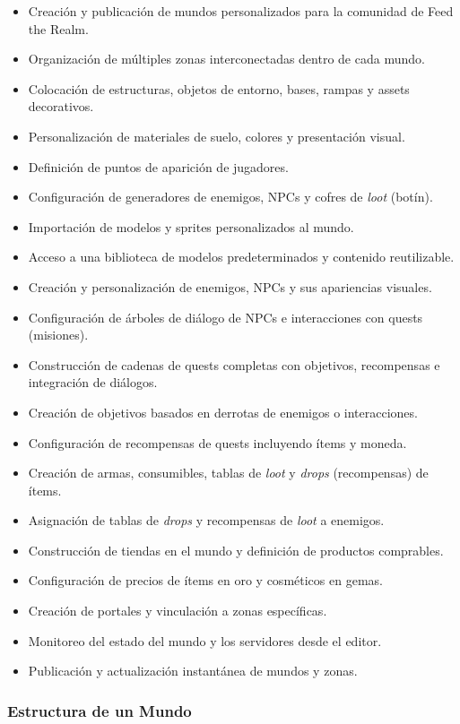 \begin{itemize}
  \item Creación y publicación de mundos personalizados para la comunidad de Feed the Realm.
  \item Organización de múltiples zonas interconectadas dentro de cada mundo.
  \item Colocación de estructuras, objetos de entorno, bases, rampas y assets decorativos.
  \item Personalización de materiales de suelo, colores y presentación visual.
  \item Definición de puntos de aparición de jugadores.
  \item Configuración de generadores de enemigos, NPCs y cofres de \textit{loot} (botín).
  \item Importación de modelos y sprites personalizados al mundo.
  \item Acceso a una biblioteca de modelos predeterminados y contenido reutilizable.
  \item Creación y personalización de enemigos, NPCs y sus apariencias visuales.
  \item Configuración de árboles de diálogo de NPCs e interacciones con quests (misiones).
  \item Construcción de cadenas de quests completas con objetivos, recompensas e integración de diálogos.
  \item Creación de objetivos basados en derrotas de enemigos o interacciones.
  \item Configuración de recompensas de quests incluyendo ítems y moneda.
  \item Creación de armas, consumibles, tablas de \textit{loot} y \textit{drops} (recompensas) de ítems.
  \item Asignación de tablas de \textit{drops} y recompensas de \textit{loot} a enemigos.
  \item Construcción de tiendas en el mundo y definición de productos comprables.
  \item Configuración de precios de ítems en oro y cosméticos en gemas.
  \item Creación de portales y vinculación a zonas específicas.
  \item Monitoreo del estado del mundo y los servidores desde el editor.
  \item Publicación y actualización instantánea de mundos y zonas.
\end{itemize}

\subsubsection{Estructura de un Mundo}

